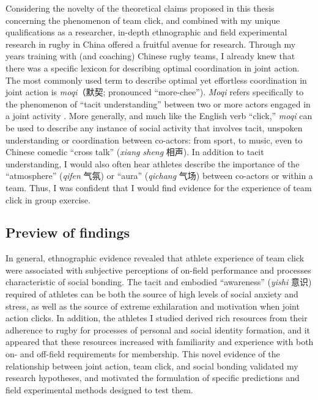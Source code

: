 \begin{CJK}{UTF8}{gbsn}
Considering the novelty of the theoretical claims proposed in this thesis concerning the phenomenon of team click, and combined with my unique qualifications as a researcher, in-depth ethnographic and field experimental research in rugby in China offered a fruitful avenue for research.  Through my years training with (and coaching) Chinese rugby teams, I already knew that there was a specific lexicon for describing optimal coordination in joint action.  The most commonly used term to describe optimal yet effortless coordination in joint action is \textit{moqi}（默契; pronounced ``more-chee'').  \textit{Moqi} refers specifically to the phenomenon of ``tacit understanding'' between two or more actors engaged in a joint activity \citep{Pleco2018}. More generally, and much like the English verb ``click,'' \textit{moqi} can be used to describe any instance of social activity that involves tacit, unspoken understanding or coordination between co-actors: from sport, to music, even to Chinese comedic ``cross talk'' (\textit{xiang sheng} 相声).  In addition to tacit understanding, I would also often hear athletes describe the importance of the ``atmosphere'' (\textit{qifen} 气氛) or ``aura'' (\textit{qichang} 气场) between co-actors or within a team.  Thus, I was confident that I would find evidence for the experience of team click in group exercise.

\subsection{Preview of findings}
In general, ethnographic evidence revealed that athlete experience of team click were associated with subjective perceptions of on-field performance and processes characteristic of social bonding.  The tacit and embodied ``awareness'' (\textit{yishi} 意识) required of athletes can be both the source of high levels of social anxiety and stress, as well as the source of extreme exhilaration and motivation when joint action clicks.  In addition, the athletes I studied derived rich resources from their adherence to rugby for processes of personal and social identity formation, and it appeared that these resources increased with familiarity and experience with both on- and off-field requirements for membership.  This novel evidence of the relationship between joint action, team click, and social bonding validated my research hypotheses, and motivated the formulation of specific predictions and field experimental methods designed to test them.


\end{CJK}

